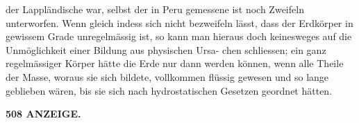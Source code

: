 \documentclass[12pt,a4paper]{article}
\begin{document}
der  Lappländische  war,  selbst  der  in  Peru  gemessene  ist  noch  Zweifeln  unterworfen. Wenn  gleich  indess  sich  nicht  bezweifeln  lässt,  dass  der  Erdkörper  in  gewissem  Grade  unregelmässig ist,  so  kann  man  hieraus  doch  keinesweges  auf  die  Unmöglichkeit  einer  Bildung  aus  physischen  Ursa- chen schliessen;  ein  ganz  regelmässiger  Körper  hätte  die  Erde  nur  dann  werden  können,  wenn  alle  Theile der  Masse,  woraus  sie  sich  bildete,  vollkommen  flüssig  gewesen  und  so  lange  geblieben  wären,  bis  sie sich  nach  hydrostatischen  Gesetzen  geordnet  hätten.

\vspace{0.5em}


\noindent\textbf{508  ANZEIGE.}
\end{document}

